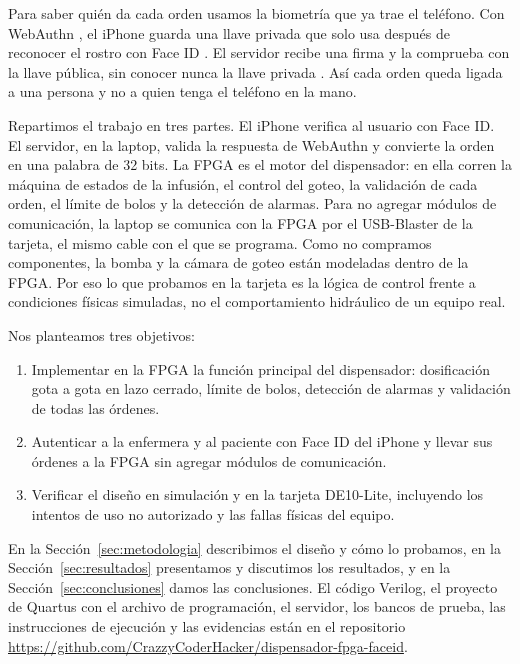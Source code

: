 \documentclass[11pt,letterpaper]{article}
\begin{document}
Para saber quién da cada orden usamos la biometría que ya trae el teléfono. Con WebAuthn \cite{webauthn}, el iPhone guarda una llave privada que solo usa después de reconocer el rostro con Face ID \cite{apple_passkeys,apple_biometric}. El servidor recibe una firma y la comprueba con la llave pública, sin conocer nunca la llave privada \cite{apple_passkeys}. Así cada orden queda ligada a una persona y no a quien tenga el teléfono en la mano.

Repartimos el trabajo en tres partes. El iPhone verifica al usuario con Face ID. El servidor, en la laptop, valida la respuesta de WebAuthn y convierte la orden en una palabra de 32 bits. La FPGA es el motor del dispensador: en ella corren la máquina de estados de la infusión, el control del goteo, la validación de cada orden, el límite de bolos y la detección de alarmas. Para no agregar módulos de comunicación, la laptop se comunica con la FPGA por el USB-Blaster de la tarjeta, el mismo cable con el que se programa. Como no compramos componentes, la bomba y la cámara de goteo están modeladas dentro de la FPGA. Por eso lo que probamos en la tarjeta es la lógica de control frente a condiciones físicas simuladas, no el comportamiento hidráulico de un equipo real.

Nos planteamos tres objetivos:
\begin{enumerate}
\item Implementar en la FPGA la función principal del dispensador: dosificación gota a gota en lazo cerrado, límite de bolos, detección de alarmas y validación de todas las órdenes.
\item Autenticar a la enfermera y al paciente con Face ID del iPhone y llevar sus órdenes a la FPGA sin agregar módulos de comunicación.
\item Verificar el diseño en simulación y en la tarjeta DE10-Lite, incluyendo los intentos de uso no autorizado y las fallas físicas del equipo.
\end{enumerate}

En la Sección~\ref{sec:metodologia} describimos el diseño y cómo lo probamos, en la Sección~\ref{sec:resultados} presentamos y discutimos los resultados, y en la Sección~\ref{sec:conclusiones} damos las conclusiones. El código Verilog, el proyecto de Quartus con el archivo de programación, el servidor, los bancos de prueba, las instrucciones de ejecución y las evidencias están en el repositorio \url{https://github.com/CrazzyCoderHacker/dispensador-fpga-faceid}.

\end{document}
